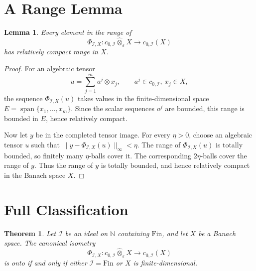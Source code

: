 \documentclass[11pt]{article}
\newtheorem{theorem}{Theorem}
\newtheorem{lemma}{Lemma}
\newcommand{\N}{\mathbb N}
\newcommand{\Fin}{\mathrm{Fin}}
\newcommand{\eps}{\varepsilon}
\begin{document}
\section*{A Range Lemma}

\begin{lemma}
Every element in the range of
\[
  \Phi_{\mathcal I,X}:c_{0,\mathcal I}\hat\otimes_\eps X
  \to c_{0,\mathcal I}(X)
\]
has relatively compact range in \(X\).
\end{lemma}

\begin{proof}
For an algebraic tensor
\[
  u=\sum_{j=1}^m a^j\otimes x_j,
  \qquad a^j\in c_{0,\mathcal I},\ x_j\in X,
\]
the sequence \(\Phi_{\mathcal I,X}(u)\) takes values in the finite-dimensional
space \(E=\operatorname{span}\{x_1,\ldots,x_m\}\).  Since the scalar sequences
\(a^j\) are bounded, this range is bounded in \(E\), hence relatively compact.

Now let \(y\) be in the completed tensor image.  For every \(\eta>0\), choose
an algebraic tensor \(u\) such that
\(\|y-\Phi_{\mathcal I,X}(u)\|_\infty<\eta\).  The range of
\(\Phi_{\mathcal I,X}(u)\) is totally bounded, so finitely many \(\eta\)-balls
cover it.  The corresponding \(2\eta\)-balls cover the range of \(y\).  Thus
the range of \(y\) is totally bounded, and hence relatively compact in the
Banach space \(X\).
\end{proof}

\section*{Full Classification}

\begin{theorem}
Let \(\mathcal I\) be an ideal on \(\N\) containing \(\Fin\), and let \(X\) be
a Banach space.  The canonical isometry
\[
  \Phi_{\mathcal I,X}:c_{0,\mathcal I}\hat\otimes_\eps X
  \to c_{0,\mathcal I}(X)
\]
is onto if and only if either \(\mathcal I=\Fin\) or \(X\) is
finite-dimensional.
\end{theorem}
\end{document}
